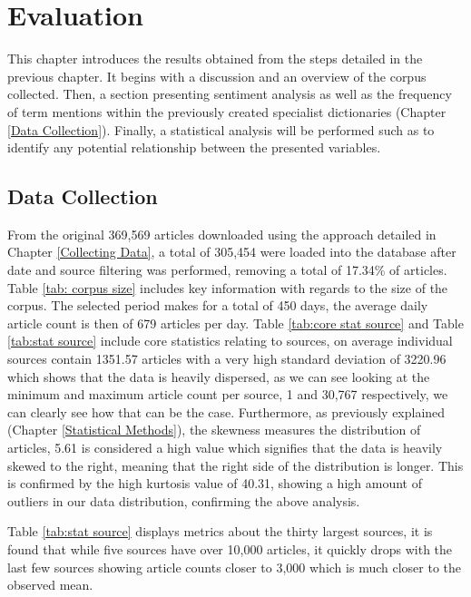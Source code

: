 \chapter{Evaluation}\label{Evalutation}

This chapter introduces the results obtained from the steps detailed in the previous chapter. It begins with a discussion and an overview of the corpus collected. Then, a section presenting sentiment analysis as well as the frequency of term mentions within the previously created specialist dictionaries (Chapter \ref{Data Collection}). Finally, a statistical analysis will be performed such as to identify any potential relationship between the presented variables. 

\section{Data Collection}

From the original 369,569 articles downloaded using the approach detailed in Chapter \ref{Collecting Data}, a total of 305,454 were loaded into the database after date and source filtering was performed, removing a total of 17.34\% of articles. Table \ref{tab: corpus size} includes key information with regards to  the size of the corpus. The selected period makes for a total of 450 days, the average daily article count is then of 679 articles per day. Table \ref{tab:core stat source} and Table \ref{tab:stat source} include core statistics relating to sources, on average individual sources contain 1351.57 articles with a very high standard deviation of 3220.96 which shows that the data is heavily dispersed, as we can see looking at the minimum and maximum article count per source, 1 and 30,767 respectively, we can clearly see how that can be the case. Furthermore, as previously explained (Chapter \ref{Statistical Methods}), the skewness measures the distribution of articles, 5.61 is considered a high value which signifies that the data is heavily skewed to the right, meaning that the right side of the distribution is longer. This is confirmed by the high kurtosis value of 40.31, showing a high amount of outliers in our data distribution, confirming the above analysis.

Table \ref{tab:stat source} displays metrics about the thirty largest sources, it is found that while five sources have over 10,000 articles, it quickly drops with the last few sources showing article counts closer to 3,000 which is much closer to the observed mean.

